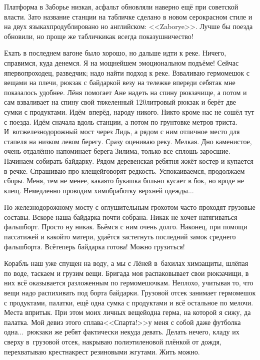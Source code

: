 Платформа в Заборье низкая, асфальт обновляли наверно ещё при советской власти. Зато название станции на табличке сделано в новом серо\sdash красном стиле и на двух языках\mdash продублировано но английском: <<Zaborye>>. Лучше бы поезда обновили, но проще же таблички\mdash как всегда показушничество! 

Ехать в последнем вагоне было хорошо, но дальше идти к реке. Ничего, справимся, куда денемся. Я на мощнейшем эмоциональном подъёме! Сейчас я\mdash первопроходец, разведчик; надо найти подход к реке.  Взваливаю гермомешок с вещами на плечи, рюкзак с байдаркой везу на тележке впереди себя\mdash так мне показалось удобнее. Лёня помогает Ане надеть на спину рюкзачище, а потом и сам взваливает на спину свой тяжеленный 120\sdash литровый рюкзак и берёт две сумки с продуктами. Идём~вперёд, народу никого. Никто кроме нас не сошёл тут с поезда. Идём сначала вдоль станции, а потом по грунтовке метров триста. И~вот\mdash железнодорожный мост через Лидь, а рядом с ним отличное место для стапеля на низком левом берегу. 
\newpage
Сразу оцениваю реку. Мелкая. Дно каменистое, очень отдалённо напоминает берега Зилима, только все сплошь заросшие. Начинаем собирать байдарку. Рядом деревенская ребятня жжёт костер и купается в речке. Спрашиваю про клещей\mdash говорят редкость. Успокаиваемся, продолжаем сборы. Меня, тем не менее, какая\sdash то букашка больно кусает в бок, но вроде не клещ. Немедленно проводим химобработку верхней одежды$\ldots$

По железнодорожному мосту с оглушительным грохотом часто проходят грузовые составы. Вскоре наша байдарка почти собрана. Никак не хочет натягиваться фальшборт. Просто ну никак. Бьёмся с ним очень долго. Наконец, при помощи пассатижей и какой\sdash то матери, удаётся застегнуть последний замок среднего фальшборта. Всё\mdash теперь байдарка готова! Можно грузиться! 

Корабль наш уже спущен на воду, а мы с Лёней в~бахилах химзащиты, шлёпая по воде, таскаем и грузим вещи. Бригада моя распаковывает свои рюкзачищи, в них всё оказывается разложенным по гермомешочкам. Неплохо, учитывая то, что вещи надо распихивать под борта байдарки. Грузовой отсек занимает гермомешок с продуктами, палатки, ещё одна сумка с продуктами и всё остальное по мелочи. Места впритык. При этом моих личных вещей\mdash одна герма, на которой я сижу, да палатка. Мой девиз этого сплава\mdash <<Спарта!>>\mdash у меня с собой даже футболка одна$\ldots$~рюкзаки же ребят фактически некуда девать. Делать нечего, кладу их сверху в~грузовой отсек, накрываю полиэтиленовой плёнкой от дождя, перехватываю крест\sdash накрест резиновыми жгутами. Жить можно. 

